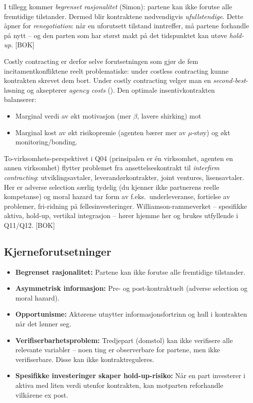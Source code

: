 I tillegg kommer \emph{begrenset rasjonalitet} (Simon): partene kan ikke forutse alle fremtidige tilstander. Dermed blir kontraktene nødvendigvis \emph{ufullstendige}. Dette åpner for \emph{renegotiation}: når en uforutsett tilstand inntreffer, må partene forhandle på nytt -- og den parten som har størst makt på det tidspunktet kan utøve \emph{hold-up}. [BOK]

Costly contracting er derfor selve forutsetningen som gjør de fem incitamentkonfliktene reelt problematiske: under costless contracting kunne kontrakten skrevet dem bort. Under costly contracting velger man en \emph{second-best}-løsning og aksepterer \emph{agency costs} (). Den optimale insentivkontrakten balanserer:
\begin{itemize}\setlength{\itemsep}{2pt}
\item Marginal verdi av økt motivasjon (mer $\beta$, lavere shirking) mot
\item Marginal kost av økt risikopremie (agenten bærer mer av $\mu$-støy) og økt monitoring/bonding.
\end{itemize}

To-virksomhets-perspektivet i Q04 (prinsipalen er én virksomhet, agenten en annen virksomhet) flytter problemet fra ansettelseskontrakt til \emph{interfirm contracting}: utviklingsavtaler, leverandørkontrakter, joint ventures, lisensavtaler. Her er adverse selection særlig tydelig (du kjenner ikke partnerens reelle kompetanse) og moral hazard tar form av f.eks.\ underleveranse, fortielse av problemer, fri-ridning på fellesinvesteringer. Williamson-rammeverket -- spesifikke aktiva, hold-up, vertikal integrasjon -- hører hjemme her og brukes utfyllende i Q11/Q12. [BOK]

\subsection*{Kjerneforutsetninger}
\begin{itemize}
\item \textbf{Begrenset rasjonalitet:} Partene kan ikke forutse alle fremtidige tilstander.
\item \textbf{Asymmetrisk informasjon:} Pre- og post-kontraktuelt (adverse selection og moral hazard).
\item \textbf{Opportunisme:} Aktørene utnytter informasjonsfortrinn og hull i kontrakten når det lønner seg.
\item \textbf{Verifiserbarhetsproblem:} Tredjepart (domstol) kan ikke verifisere alle relevante variabler -- noen ting er observerbare for partene, men ikke verifiserbare. Disse kan ikke kontraktreguleres.
\item \textbf{Spesifikke investeringer skaper hold-up-risiko:} Når en part investerer i aktiva med liten verdi utenfor kontrakten, kan motparten reforhandle vilkårene ex post.
\end{itemize}

